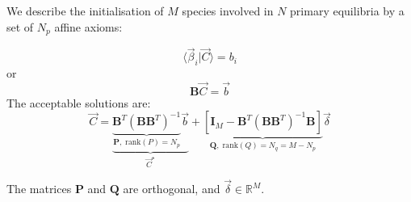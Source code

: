 \documentclass[aps,12pt]{revtex4}
\begin{document}
We describe the initialisation of $M$ species involved in $N$ primary equilibria by a set of $N_p$ affine axioms:

\begin{equation}
	\langle \vec{\beta}_i \vert \vec C \rangle = b_i
\end{equation}
or
\begin{equation}
	\bm{B} \vec C = \vec b
\end{equation}
The acceptable solutions are:
\begin{equation}
	\vec C = \underbrace{\underbrace{\bm{B}^T \left(\bm{B} \bm{B}^T\right)^{-1}}_{\bm{P},\;\mathrm{rank}(P)=N_p} \vec b}_{\vec C^\star}
	+ \underbrace{\left[ \bm{I}_M - \bm{B}^T \left(\bm{B} \bm{B}^T\right)^{-1} \bm{B} \right]}_{\bm{Q},\;\mathrm{rank}(Q)=N_q=M-N_p}\vec \delta
\end{equation}

The matrices $\bm{P}$ and $\bm{Q}$ are orthogonal, and $\vec\delta\in\mathbb{R}^M$.
\end{document}
